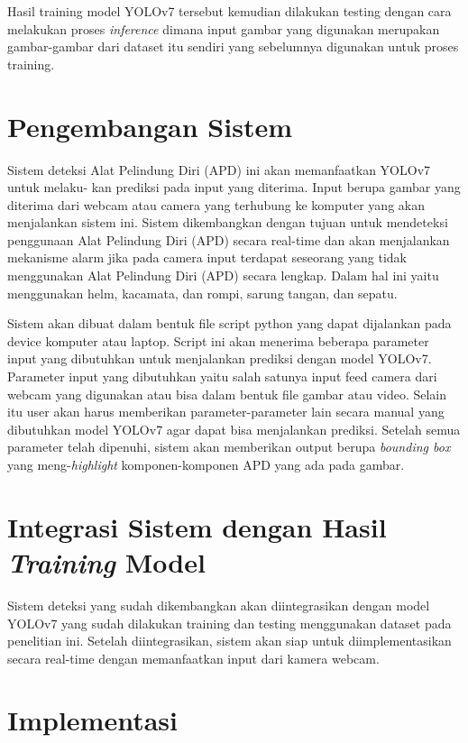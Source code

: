 \par Hasil training model YOLOv7 tersebut kemudian dilakukan testing dengan cara melakukan proses \textit{inference} dimana input gambar yang digunakan merupakan gambar-gambar dari dataset itu sendiri yang sebelumnya digunakan untuk proses training.

\section{Pengembangan Sistem}
\label{sec:pengembangansistem}

Sistem deteksi Alat Pelindung Diri (APD) ini akan memanfaatkan YOLOv7 untuk melaku- kan prediksi pada input yang diterima. Input berupa gambar yang diterima dari
webcam atau camera yang terhubung ke komputer yang akan menjalankan sistem ini.
Sistem dikembangkan dengan tujuan untuk mendeteksi penggunaan Alat Pelindung Diri (APD) secara real-time dan akan menjalankan mekanisme alarm jika pada camera input
terdapat seseorang yang tidak menggunakan Alat Pelindung Diri (APD) secara lengkap. Dalam hal ini yaitu menggunakan helm, kacamata, dan rompi, sarung tangan, dan sepatu.

Sistem akan dibuat dalam bentuk file script python yang dapat dijalankan pada device komputer atau laptop. Script ini akan menerima beberapa parameter input yang dibutuhkan untuk menjalankan prediksi dengan model YOLOv7. Parameter input yang dibutuhkan yaitu salah satunya input feed camera dari webcam yang digunakan atau bisa dalam bentuk file gambar atau video.
Selain itu user akan harus memberikan parameter-parameter lain secara manual yang dibutuhkan model YOLOv7 agar dapat bisa menjalankan prediksi. Setelah semua parameter telah dipenuhi, sistem akan memberikan output berupa \textit{bounding box} yang meng-\textit{highlight} komponen-komponen APD yang ada pada gambar.

\section{Integrasi Sistem dengan Hasil \emph{Training} Model}
\label{subsec:integrasi}

Sistem deteksi yang sudah dikembangkan akan diintegrasikan dengan model YOLOv7 yang sudah dilakukan training dan testing menggunakan dataset pada penelitian ini. Setelah diintegrasikan, sistem akan siap untuk diimplementasikan secara real-time dengan memanfaatkan input dari kamera webcam.

\section{Implementasi}
\label{subsec:implementasi}

